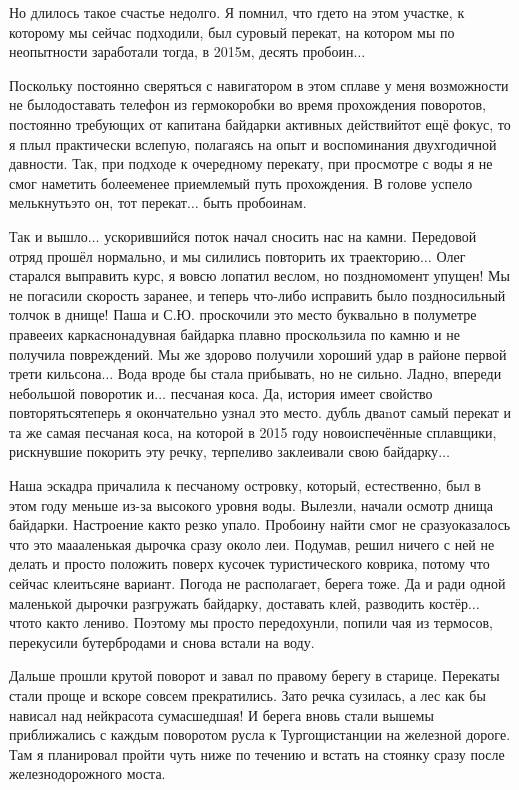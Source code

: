 Но длилось такое счастье недолго. Я помнил, что где\sdash то на этом участке, к которому мы сейчас подходили, был суровый перекат, на котором мы по неопытности заработали тогда, в 2015\sdash м, десять пробоин$\ldots$

Поскольку постоянно сверяться с навигатором в этом сплаве у меня возможности не было\mdash доставать телефон из гермокоробки во время прохождения поворотов, постоянно требующих от капитана байдарки активных действий\mdash тот ещё фокус, то я плыл практически вслепую, полагаясь на опыт и воспоминания двухгодичной давности. Так, при подходе к очередному перекату, при просмотре с воды я не смог наметить более\sdash менее приемлемый путь прохождения. В голове успело мелькнуть\mdash это он, тот перекат$\ldots$ быть пробоинам.

Так и вышло$\ldots$ ускорившийся поток начал сносить нас на камни. Передовой отряд прошёл нормально, и мы силились повторить их траекторию$\ldots$ Олег старался выправить курс, я вовсю лопатил веслом, но поздно\mdash момент упущен! Мы не погасили скорость заранее, и теперь что-либо исправить было поздно\mdash сильный толчок в днище! Паша и С.Ю. проскочили это место буквально в полуметре правее\mdash их каркасно\sdash надувная байдарка плавно проскользила по камню и не получила повреждений. Мы же здорово получили хороший удар в районе первой трети кильсона$\ldots$ Вода вроде бы стала прибывать, но не сильно. Ладно, впереди небольшой поворотик и$\ldots$ песчаная коса. Да, история имеет свойство повторяться\mdash теперь я окончательно узнал это место. дубль два\mdash nот самый перекат и та же самая песчаная коса, на которой в 2015 году новоиспечённые сплавщики, рискнувшие покорить эту речку, терпеливо заклеивали свою байдарку$\ldots$ 

Наша эскадра причалила к песчаному островку, который, естественно, был в этом году меньше из-за высокого уровня воды. Вылезли, начали осмотр днища байдарки. Настроение как\sdash то резко упало. Пробоину найти смог не сразу\mdash оказалось что это ма\sdash а\sdash аленькая дырочка сразу около леи. Подумав, решил ничего с ней не делать и просто положить поверх кусочек туристического коврика, потому что сейчас клеиться\mdash не вариант. Погода не располагает, берега тоже. Да и ради одной маленькой дырочки разгружать байдарку, доставать клей, разводить костёр$\ldots$ что\sdash то как\sdash то лениво. Поэтому мы просто передохунли, попили чая из термосов, перекусили бутербродами и снова встали на воду.

Дальше прошли крутой поворот и завал по правому берегу в старице. Перекаты стали проще и вскоре совсем прекратились. Зато речка сузилась, а лес как бы нависал над ней\mdash красота сумасшедшая! И берега вновь стали выше\mdash мы приближались с каждым поворотом русла к Тургощи\mdash станции на железной дороге. Там я планировал пройти чуть ниже по течению и встать на стоянку сразу после железнодорожного моста. 

